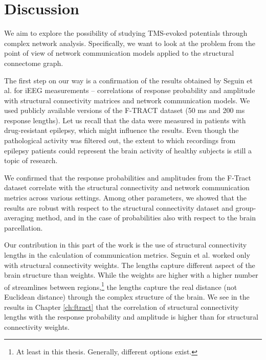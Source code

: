 \chapter{Discussion}

We aim to explore the possibility of studying TMS-evoked potentials through complex network analysis. Specifically, we want to look at the problem from the point of view of network communication models applied to the structural connectome graph. 

The first step on our way is a confirmation of the results obtained by Seguin et al. \cite{seguin_communication_2023} for iEEG measurements -- correlations of response probability and amplitude with structural connectivity matrices and network communication models. We used publicly available versions of the F-TRACT dataset (50 ms and 200 ms response lengths). Let us recall that the data were measured in patients with drug-resistant epilepsy, which might influence the results. Even though the pathological activity was filtered out, the extent to which recordings from epilepsy patients could represent the brain activity of healthy subjects is still a topic of research. \cite{seguin_communication_2023}

We confirmed that the response probabilities and amplitudes from the F-Tract dataset correlate with the structural connectivity and network communication metrics across various settings. Among other parameters, we showed that the results are robust with respect to the structural connectivity dataset and group-averaging method, and in the case of probabilities also with respect to the brain parcellation. 

Our contribution in this part of the work is the use of structural connectivity lengths in the calculation of communication metrics. Seguin et al. \cite{seguin_communication_2023} worked only with structural connectivity weights. The lengths capture different aspect of the brain structure than weights. While the weights are higher with a higher number of streamlines between regions,\footnote{At least in this thesis. Generally, different options exist.} the lengths capture the real distance (not Euclidean distance) through the complex structure of the brain. We see in the results in Chapter \ref{ch:ftract} that the correlation of structural connectivity lengths with the response probability and amplitude is higher than for structural connectivity weights.

